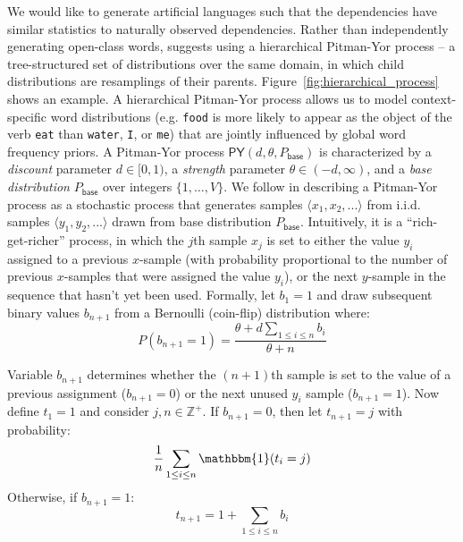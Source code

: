 \documentclass[11pt]{article}
\begin{document}
We would like to generate artificial languages such that the dependencies have similar statistics to naturally observed dependencies. Rather than independently generating open-class words, \citet{teh-2006-hierarchical} suggests using a hierarchical Pitman-Yor process \cite{pitman1997two} -- a tree-structured set of distributions over the same domain, in which child distributions are resamplings of their parents. Figure~\ref{fig:hierarchical_process} shows an example. A hierarchical Pitman-Yor process allows us to model context-specific word distributions (e.g. \texttt{food} is more likely to appear as the object of the verb \texttt{eat} than \texttt{water}, \texttt{I}, or \texttt{me}) that are jointly influenced by global word frequency priors. A Pitman-Yor process $\mathsf{PY}(d, \theta, P_{\mathsf{base}})$ is characterized by a \emph{discount} parameter $d \in [0,1)$, a \emph{strength} parameter $\theta \in (-d,\infty)$, and a \emph{base distribution} $P_{\mathsf{base}}$ over integers $\{1, \dots, V\}$. We follow \cite{teh-2006-hierarchical} in describing a Pitman-Yor process as a stochastic process that generates samples $\langle x_1, x_2, ... \rangle$ from i.i.d. samples $\langle y_1, y_2, ... \rangle$ drawn from base distribution $P_{\mathsf{base}}$. Intuitively, it is a ``rich-get-richer'' process, in which the $j$th sample $x_j$ is set to either the value $y_i$ assigned to a previous $x$-sample (with probability proportional to the number of previous $x$-samples that were assigned the value $y_i$), or the next $y$-sample in the sequence that hasn't yet been used. Formally, let $b_1=1$ and draw subsequent binary values $b_{n+1}$ from a Bernoulli (coin-flip) distribution where:
\begin{equation*}
	P(b_{n+1} = 1) =\frac{\theta + d\sum\limits_{1 \leq i \leq n} b_i}{\theta + n} 
\end{equation*}

\noindent Variable $b_{n+1}$ determines whether the $(n+1)$th sample is set to the value of a previous assignment ($b_{n+1}=0$) or the next unused $y_i$ sample ($b_{n+1}=1$). Now define $t_1 = 1$ and consider $j, n \in \mathbb{Z}^+$. If $b_{n+1}=0$, then let $t_{n+1}=j$ with probability:
\begin{equation*}
	\frac{1}{n} \sum\limits_{1 \leq i \leq n} \mathbbm{1}(t_i=j)
\end{equation*}
Otherwise, if $b_{n+1}=1$: 
\begin{equation*}
t_{n+1}=1 + \sum\limits_{1 \leq i \leq n} b_i
\end{equation*}
\end{document}
